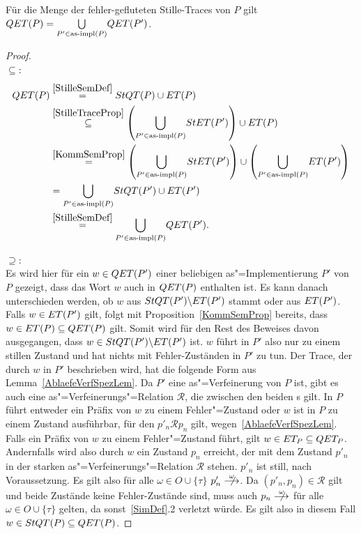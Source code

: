 \vspace{0.2cm}

\begin{Prop}
  \label{StilleSemProp}
  Für die Menge der fehler-gefluteten Stille-Traces von $P$ gilt $QET (P) =
  \underset{P'\in\mathrm{as}\text{-}\mathrm{impl} (P)}{\bigcup} QET (P')$.
\end{Prop}
\begin{proof}\mbox{}\\
  \glqq$\subseteq$\grqq{}:
  \begin{align*}
    QET (P)&\overset{\ref{StilleSemDef}}{=} StQT (P) \cup ET (P)\\
    &\overset{\ref{StilleTraceProp}}{\subseteq} \left(\underset{P'\in\mathrm{as}\text{-}\mathrm{impl}
    (P)}{\bigcup} StET (P')\right)\cup ET (P)\\
    &\overset{\ref{KommSemProp}}{=} \left(\underset{P'\in\mathrm{as}\text{-}\mathrm{impl}
    (P)}{\bigcup} StET (P')\right)\cup \left(\underset{P'\in\mathrm{as}\text{-}\mathrm{impl}
    (P)}{\bigcup} ET (P')\right)\\
    &= \underset{P'\in\mathrm{as}\text{-}\mathrm{impl} (P)}{\bigcup} StQT (P') \cup ET (P')\\
    &\overset{\ref{StilleSemDef}}{=} \underset{P'\in\mathrm{as}\text{-}\mathrm{impl} (P)}{\bigcup} QET
    (P').\\
  \end{align*}

  \glqq$\supseteq$\grqq{}:\\
  Es wird hier für ein $w\in QET (P')$ einer beliebigen as"=Implementierung
  $P'$ von $P$ gezeigt, dass das Wort $w$ auch in $QET (P)$ enthalten ist. Es
  kann danach unterschieden werden, ob $w$ aus $StQT (P')\backslash ET (P')$
  stammt oder aus $ET (P')$. Falls $w\in ET (P')$ gilt, folgt mit
  Proposition~\ref{KommSemProp} bereits, dass $w\in ET (P) \subseteq QET (P)$
  gilt. Somit wird für den Rest des Beweises davon ausgegangen, dass $w\in StQT
  (P')\backslash ET (P')$ ist. $w$ führt in $P'$ also nur zu einem stillen
  Zustand und hat nichts mit Fehler-Zuständen in $P'$ zu tun. Der Trace, der
  durch $w$ in $P'$ beschrieben wird, hat die folgende Form aus
  Lemma~\ref{AblaefeVerfSpezLem}. Da $P'$ eine as"=Verfeinerung von $P$ ist,
  gibt es auch eine as"=Verfeinerungs"=Relation $\mathcal{R}$, die zwischen den
  beiden \MEIO{}s gilt. In $P$ führt entweder ein Präfix von $w$ zu einem
  Fehler"=Zustand oder $w$ ist in $P$ zu einem Zustand ausführbar, für den
  $p'_n \mathcal{R} p_n$ gilt, wegen~\ref{AblaefeVerfSpezLem}. Falls ein Präfix
  von $w$ zu einem Fehler"=Zustand führt, gilt $w\in ET _P\subseteq QET _P$.
  Andernfalls wird also durch $w$ ein Zustand $p_n$ erreicht, der mit dem
  Zustand $p'_n$ in der starken as"=Verfeinerungs"=Relation $\mathcal{R}$
  stehen. $p'_n$ ist still, nach Voraussetzung. Es gilt also für alle
  $\omega\in O\cup \{\tau\}$ $p'_n\nmust[\omega]$. Da $(p'_n,p_n)
  \in\mathcal{R}$ gilt und beide Zustände keine Fehler-Zustände sind, muss auch
  $p_n\nmust[\omega]$ für alle $\omega\in O\cup \{\tau\}$ gelten, da
  sonst~\ref{SimDef}.2 verletzt würde. Es gilt also in diesem Fall $w\in StQT
  (P)\subseteq QET (P)$.
\end{proof}

